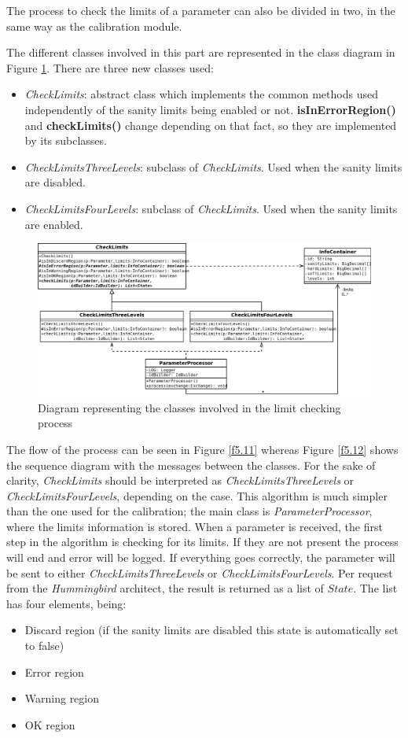 The process to check the limits of a parameter can also be divided in two, in the same way as the calibration module.

The different classes involved in this  part are represented in the class diagram in Figure \ref{f5.10}. There are three new classes used:

\begin{itemize}
	\item \emph{CheckLimits}: abstract class which implements the common methods used independently of the sanity limits being enabled or not. \textbf{isInErrorRegion()} and \textbf{checkLimits()} change depending on that fact, so they are implemented by its subclasses.
	\item \emph{CheckLimitsThreeLevels}: subclass of \emph{CheckLimits}. Used when the sanity limits are disabled.
	\item \emph{CheckLimitsFourLevels}: subclass of \emph{CheckLimits}. Used when the sanity limits are enabled. 
\end{itemize}


\begin{figure}[H]
\centerline{\includegraphics[width=1\textwidth]{images/CheckLimitsClassDiagram.png}}
\caption{Diagram representing the classes involved in the limit checking process}
\label{f5.10}
\end{figure}

The flow of the process can be seen in Figure \ref{f5.11} whereas Figure \ref{f5.12} shows the sequence diagram with the messages between the classes. For the sake of clarity, \emph{CheckLimits} should be interpreted as \emph{CheckLimitsThreeLevels} or \emph{CheckLimitsFourLevels}, depending on the case. This algorithm is much simpler than the one used for the calibration; the main class is \emph{ParameterProcessor}, where the limits information is stored. When a parameter is received, the first step in the algorithm is checking for its limits. If they are not present the process will end and error will be logged. If everything goes correctly, the parameter will be sent to either \emph{CheckLimitsThreeLevels} or \emph{CheckLimitsFourLevels}.
\newpage
Per request from the \emph{Hummingbird} architect, the result is returned as a list of $State$. The list has four elements, being:
\begin{itemize}
\item Discard region (if the sanity limits are disabled this state is automatically set to false)
\item Error region
\item Warning region
\item OK region
\end{itemize}

